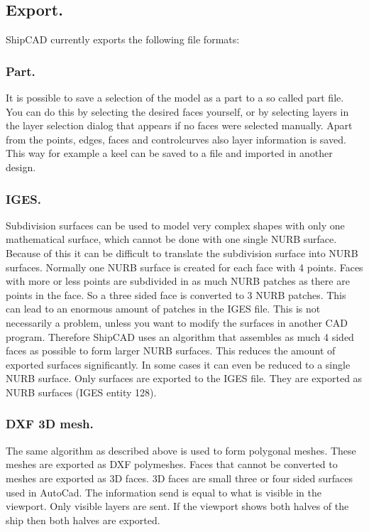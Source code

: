 \documentclass[12pt]{article}
\begin{document}
\subsection{Export.}
ShipCAD currently exports the following file formats:

\subsubsection{Part.} \label{part}
It is possible to save a selection of the model as a part to a so
called part file. You can do this by selecting the desired faces
yourself, or by selecting layers in the layer selection dialog that
appears if no faces were selected manually. Apart from the points,
edges, faces and controlcurves also layer information is saved. This
way for example a keel can be saved to a file and imported in another
design.

\subsubsection{IGES.}
Subdivision surfaces can be used to model very complex shapes with
only one mathematical surface, which cannot be done with one single
NURB surface. Because of this it can be difficult to translate the
subdivision surface into NURB surfaces. Normally one NURB surface is
created for each face with 4 points. Faces with more or less points
are subdivided in as much NURB patches as there are points in the
face. So a three sided face is converted to 3 NURB patches. This can
lead to an enormous amount of patches in the IGES file. This is not
necessarily a problem, unless you want to modify the surfaces in
another CAD program. Therefore ShipCAD uses an algorithm that
assembles as much 4 sided faces as possible to form larger NURB
surfaces. This reduces the amount of exported surfaces
significantly. In some cases it can even be reduced to a single NURB
surface. Only surfaces are exported to the IGES file. They are
exported as NURB surfaces (IGES entity 128).

\subsubsection{DXF 3D mesh.}
The same algorithm as described above is used to form polygonal meshes. These meshes are
exported as DXF polymeshes. Faces that cannot be converted to meshes are exported as 3D
faces. 3D faces are small three or four sided surfaces used in AutoCad. The information send is
equal to what is visible in the viewport. Only visible layers are sent. If the viewport shows both
halves of the ship then both halves are exported.
\end{document}
